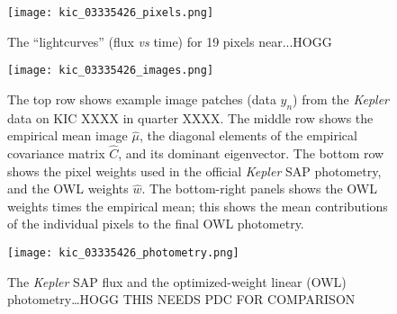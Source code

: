 \documentclass[12pt, letterpaper, preprint]{aastex}
\newcommand{\project}[1]{\textsl{#1}}
\newcommand{\foreign}[1]{\textsl{#1}}
\begin{document}
\clearpage
\begin{figure}
\texttt{[image: kic\_03335426\_pixels.png]}
\caption{
The ``lightcurves'' (flux \foreign{vs} time) for 19 pixels near...HOGG
\label{fig:pixels}}
\end{figure}

\clearpage
\begin{figure}
\texttt{[image: kic\_03335426\_images.png]}
\caption{
The top row shows example image patches (data $y_n$) from the \project{Kepler} data on KIC XXXX in quarter XXXX.
The middle row shows the empirical mean image $\hat{\mu}$,
  the diagonal elements of the empirical covariance matrix $\hat{C}$,
  and its dominant eigenvector.
The bottom row shows the pixel weights used in the official \project{Kepler} SAP photometry,
  and the OWL weights $\hat{w}$.
The bottom-right panels shows the OWL weights times the empirical mean;
  this shows the mean contributions of the individual pixels to the final OWL photometry.
\label{fig:images}}
\end{figure}

\clearpage
\begin{figure}
\texttt{[image: kic\_03335426\_photometry.png]}
\caption{
The \project{Kepler} SAP flux
  and the optimized-weight linear (OWL) photometry\ldots HOGG THIS NEEDS PDC FOR COMPARISON
\label{fig:results}}
\end{figure}
\end{document}
